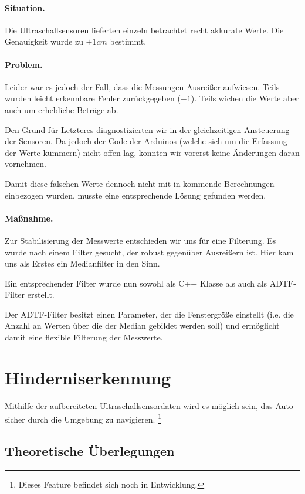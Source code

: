 \documentclass[a4paper,12pt]{report}
\begin{document}
	\paragraph{Situation.}
	Die Ultraschallsensoren lieferten einzeln betrachtet recht akkurate Werte.
	Die Genauigkeit wurde zu $\pm1cm$ bestimmt.

	\paragraph{Problem.}
	Leider war es jedoch der Fall, dass die Messungen Ausreißer aufwiesen.
	Teils wurden leicht erkennbare Fehler zurückgegeben ($-1$). Teils wichen die Werte aber auch um erhebliche Beträge ab.

	Den Grund für Letzteres diagnostizierten wir in der gleichzeitigen Ansteuerung der Sensoren.
	Da jedoch der Code der Arduinos (welche sich um die Erfassung der Werte kümmern) nicht offen lag, konnten wir vorerst keine Änderungen daran vornehmen.

	Damit diese falschen Werte dennoch nicht mit in kommende Berechnungen einbezogen wurden, musste eine entsprechende Lösung gefunden werden.

	\paragraph{Maßnahme.}
	Zur Stabilisierung der Messwerte entschieden wir uns für eine Filterung.
	Es wurde nach einem Filter gesucht, der robust gegenüber Ausreißern ist.
	Hier kam uns als Erstes ein Medianfilter in den Sinn.

	Ein entsprechender Filter wurde nun sowohl als C++ Klasse als auch als ADTF-Filter erstellt.

	Der ADTF-Filter besitzt einen Parameter, der die Fenstergröße einstellt (i.e. die Anzahl an Werten über die der Median gebildet werden soll) und ermöglicht damit eine flexible Filterung der Messwerte.

\section{Hinderniserkennung}
\label{section_ObstacleDetection}

	Mithilfe der aufbereiteten Ultraschallsensordaten wird es möglich sein, das Auto sicher durch die Umgebung zu navigieren.
	\footnote{Dieses Feature befindet sich noch in Entwicklung.} %

\subsection{Theoretische Überlegungen}
\end{document}
